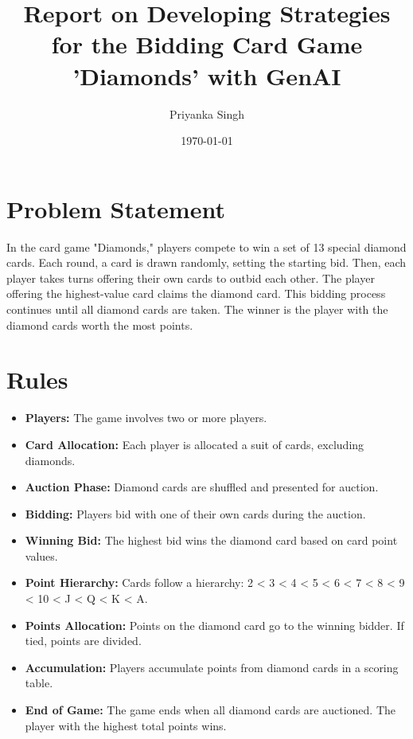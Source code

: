 \documentclass[12pt]{article}
\title{\textcolor{myblue}{\textbf{Report on Developing Strategies for the Bidding Card Game 'Diamonds' with GenAI}}}
\author{Priyanka Singh}
\date{\today}
\begin{document}
\maketitle

\section{\textcolor{myblue}{Problem Statement}}
In the card game "Diamonds," players compete to win a set of 13 special diamond cards. Each round, a card is drawn randomly, setting the starting bid. Then, each player takes turns offering their own cards to outbid each other. The player offering the highest-value card claims the diamond card. This bidding process continues until all diamond cards are taken. The winner is the player with the diamond cards worth the most points.

\section{\textcolor{myblue}{Rules}}
\begin{itemize}
    \item \textbf{Players:} The game involves two or more players.
    \item \textbf{Card Allocation:} Each player is allocated a suit of cards, excluding diamonds.
    \item \textbf{Auction Phase:} Diamond cards are shuffled and presented for auction.
    \item \textbf{Bidding:} Players bid with one of their own cards during the auction.
    \item \textbf{Winning Bid:} The highest bid wins the diamond card based on card point values.
    \item \textbf{Point Hierarchy:} Cards follow a hierarchy: 2 < 3 < 4 < 5 < 6 < 7 < 8 < 9 < 10 < J < Q < K < A.
    \item \textbf{Points Allocation:} Points on the diamond card go to the winning bidder. If tied, points are divided.
    \item \textbf{Accumulation:} Players accumulate points from diamond cards in a scoring table.
    \item \textbf{End of Game:} The game ends when all diamond cards are auctioned. The player with the highest total points wins.
\end{itemize}
\end{document}
